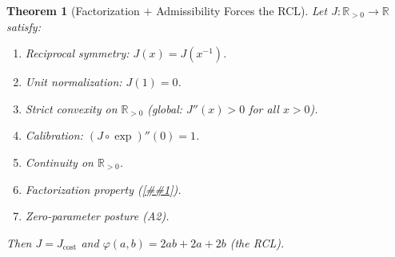 \documentclass[11pt]{article}
\providecommand{\cref}[1]{\ref{##1}}%
\newcommand{\R}{\mathbb{R}}
\newcommand{\Rp}{\mathbb{R}_{>0}}
\newcommand{\Jcost}{J_{\mathrm{cost}}}
\newtheorem{theorem}{Theorem}[section]
\theoremstyle{definition}
\theoremstyle{remark}
\begin{document}
\begin{theorem}[Factorization $+$ Admissibility Forces the RCL]
\label{thm:b2-closure}
Let $J : \Rp \to \R$ satisfy:
\begin{enumerate}
\item Reciprocal symmetry: $J(x) = J(x^{-1})$.
\item Unit normalization: $J(1) = 0$.
\item Strict convexity on $\Rp$ \textup{(}global: $J''(x) > 0$
  for all $x > 0$\textup{)}.
\item Calibration: $(J \circ \exp)''(0) = 1$.
\item Continuity on $\Rp$.
\item Factorization property \textup{(}\cref{def:factorization}\textup{)}.
\item Zero-parameter posture \textup{(}A2\textup{)}.
\end{enumerate}
Then $J = \Jcost$ and $\varphi(a,b) = 2ab + 2a + 2b$
\textup{(}the RCL\textup{)}.
\end{theorem}
\end{document}
